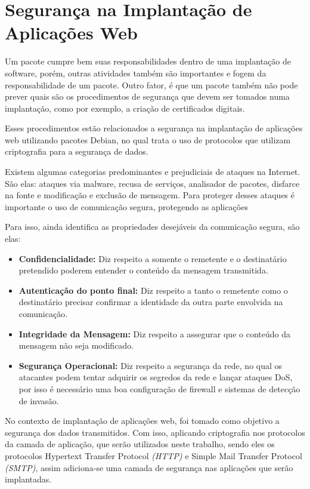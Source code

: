 \section{Segurança na Implantação de Aplicações Web}
\label{sec:seguranca}

Um pacote cumpre bem suas responsabilidades dentro de uma implantação de
software, porém, outras atividades também são importantes e fogem da responsabilidade 
de um pacote. Outro fator, é que um pacote também não pode prever quais são
os procedimentos de segurança que devem ser tomados numa implantação, como por 
exemplo, a criação de certificados digitais. 

Esses procedimentos estão relacionados a segurança na implantação de aplicações web 
utilizando pacotes Debian, no qual trata o uso de protocolos que utilizam criptografia
para a segurança de dados.

Existem algumas categorias predominantes e prejudiciais de ataques na Internet. São elas: 
ataques via malware, recusa de serviços, analisador
de pacotes, disfarce na fonte e modificação e exclusão de mensagem. Para proteger
desses ataques é importante o uso de comunicação segura, protegendo as aplicações 
\cite{kurose2010redes} 

Para isso,  ainda identifica as propriedades 
desejáveis da comunicação segura, são elas:

\begin{itemize}
  \item \textbf{Confidencialidade:} Diz respeito a somente o remetente e o destinatário
  pretendido poderem entender o conteúdo da mensagem transmitida.
  \item \textbf{Autenticação do ponto final:} Diz respeito a tanto o remetente como o destinatário
  precisar confirmar a identidade da outra parte envolvida na comunicação.
  \item \textbf{Integridade da Mensagem:} Diz respeito a assegurar que o conteúdo
  da mensagem não seja modificado.
  \item \textbf{Segurança Operacional:} Diz respeito a segurança da rede, no qual
  os atacantes podem tentar adquirir os segredos da rede e lançar ataques DoS,
  por isso é necessário uma boa configuração de firewall e sistemas de detecção
  de invasão.
\end{itemize}

No contexto de implantação de aplicações web, foi tomado como objetivo a segurança
dos dados transmitidos. Com isso, aplicando criptografia nos protocolos da camada
de aplicação, que serão utilizados neste trabalho, sendo eles os protocolos 
Hypertext Transfer Protocol \textit{(HTTP)} e Simple Mail Transfer Protocol 
\textit{(SMTP)}, assim adiciona-se uma camada de segurança nas aplicações que serão implantadas.

